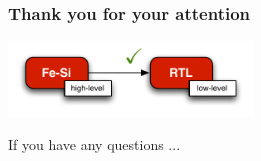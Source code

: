 \documentclass[9pt]{beamer}
\begin{document}
\begin{frame}
  \frametitle{Thank you for your attention}
  
  \begin{center}
    \includegraphics[height= 2cm ]{figs/compilation.pdf}

    \vspace{1cm}

    If you have any questions ... \\
  \end{center}
  
\end{frame}
\end{document}
